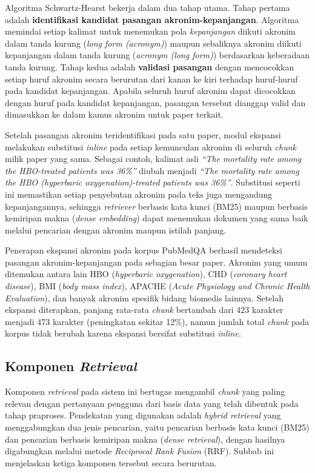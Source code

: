 Algoritma Schwartz-Hearst bekerja dalam dua tahap utama. Tahap pertama adalah \textbf{identifikasi kandidat pasangan akronim-kepanjangan}. Algoritma memindai setiap kalimat untuk menemukan pola \textit{kepanjangan} diikuti akronim dalam tanda kurung (\textit{long form (acronym)}) maupun sebaliknya akronim diikuti kepanjangan dalam tanda kurung (\textit{acronym (long form)}) berdasarkan keberadaan tanda kurung. Tahap kedua adalah \textbf{validasi pasangan} dengan mencocokkan setiap huruf akronim secara berurutan dari kanan ke kiri terhadap huruf-huruf pada kandidat kepanjangan. Apabila seluruh huruf akronim dapat dicocokkan dengan huruf pada kandidat kepanjangan, pasangan tersebut dianggap valid dan dimasukkan ke dalam kamus akronim untuk paper terkait.

Setelah pasangan akronim teridentifikasi pada satu paper, modul ekspansi melakukan substitusi \textit{inline} pada setiap kemunculan akronim di seluruh \textit{chunk} milik paper yang sama. Sebagai contoh, kalimat asli \textit{``The mortality rate among the HBO-treated patients was 36\%''} diubah menjadi \textit{``The mortality rate among the HBO (hyperbaric oxygenation)-treated patients was 36\%''}. Substitusi seperti ini memastikan setiap penyebutan akronim pada teks juga mengandung kepanjangannya, sehingga \textit{retriever} berbasis kata kunci (BM25) maupun berbasis kemiripan makna (\textit{dense embedding}) dapat menemukan dokumen yang sama baik melalui pencarian dengan akronim maupun istilah panjang.

Penerapan ekspansi akronim pada korpus PubMedQA berhasil mendeteksi pasangan akronim-kepanjangan pada sebagian besar paper. Akronim yang umum ditemukan antara lain HBO (\textit{hyperbaric oxygenation}), CHD (\textit{coronary heart disease}), BMI (\textit{body mass index}), APACHE (\textit{Acute Physiology and Chronic Health Evaluation}), dan banyak akronim spesifik bidang biomedis lainnya. Setelah ekspansi diterapkan, panjang rata-rata \textit{chunk} bertambah dari 423 karakter menjadi 473 karakter (peningkatan sekitar 12\%), namun jumlah total \textit{chunk} pada korpus tidak berubah karena ekspansi bersifat substitusi \textit{inline}.

\subsection{Komponen \textit{Retrieval}}
\label{subsec:komponen-retrieval}

Komponen \textit{retrieval} pada sistem ini bertugas mengambil \textit{chunk} yang paling relevan dengan pertanyaan pengguna dari basis data yang telah dibentuk pada tahap praproses. Pendekatan yang digunakan adalah \textit{hybrid retrieval} yang menggabungkan dua jenis pencarian, yaitu pencarian berbasis kata kunci (BM25) dan pencarian berbasis kemiripan makna (\textit{dense retrieval}), dengan hasilnya digabungkan melalui metode \textit{Reciprocal Rank Fusion} (RRF). Subbab ini menjelaskan ketiga komponen tersebut secara berurutan.

